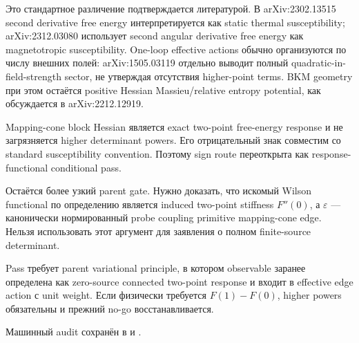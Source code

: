 Это стандартное различение подтверждается литературой. В arXiv:2302.13515
second derivative free energy интерпретируется как static thermal
susceptibility; arXiv:2312.03080 использует second angular derivative free
energy как magnetotropic susceptibility. One-loop effective actions обычно
организуются по числу внешних полей: arXiv:1505.03119 отдельно выводит полный
quadratic-in-field-strength sector, не утверждая отсутствия higher-point
terms. BKM geometry при этом остаётся positive Hessian Massieu/relative
entropy potential, как обсуждается в arXiv:2212.12919.

\begin{proposition}
Mapping-cone block Hessian является exact two-point free-energy response и
не загрязняется higher determinant powers. Его отрицательный знак совместим
со standard susceptibility convention. Поэтому sign route переоткрыта как
response-functional conditional pass.
\end{proposition}

Остаётся более узкий parent gate. Нужно доказать, что искомый Wilson
functional по определению является induced two-point stiffness
\(F''(0)\), а \(\varepsilon\) --- канонически нормированный probe coupling
primitive mapping-cone edge. Нельзя использовать этот аргумент для заявления
о полном finite-source determinant.

\begin{nogocriterion}
Pass требует parent variational principle, в котором observable заранее
определена как zero-source connected two-point response и входит в effective
edge action с unit weight. Если физически требуется \(F(1)-F(0)\), higher
powers обязательны и прежний no-go восстанавливается.
\end{nogocriterion}

Машинный audit сохранён в
 и
.